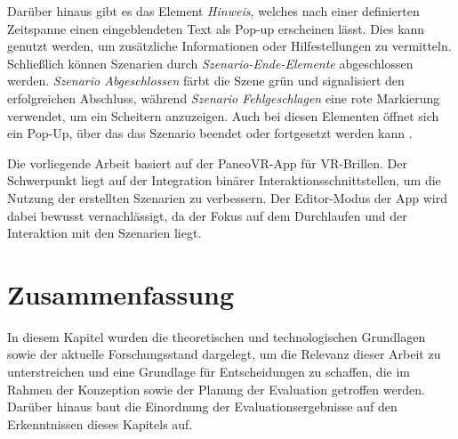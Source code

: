 Darüber hinaus gibt es das Element \textit{Hinweis}, welches nach einer definierten Zeitspanne einen eingeblendeten Text als Pop-up erscheinen lässt. Dies kann genutzt werden, um zusätzliche Informationen oder Hilfestellungen zu vermitteln. Schließlich können Szenarien durch \textit{Szenario-Ende-Elemente} abgeschlossen werden. \textit{Szenario Abgeschlossen} färbt die Szene grün und signalisiert den erfolgreichen Abschluss, während \textit{Szenario Fehlgeschlagen} eine rote Markierung verwendet, um ein Scheitern anzuzeigen. Auch bei diesen Elementen öffnet sich ein Pop-Up, über das das Szenario beendet oder fortgesetzt werden kann \citep{paneovr-handbuch}.

Die vorliegende Arbeit basiert auf der PaneoVR-App für VR-Brillen. Der Schwerpunkt liegt auf der Integration binärer Interaktionsschnittstellen, um die Nutzung der erstellten Szenarien zu verbessern. Der Editor-Modus der App wird dabei bewusst vernachlässigt, da der Fokus auf dem Durchlaufen und der Interaktion mit den Szenarien liegt.

\section{Zusammenfassung} 

In diesem Kapitel wurden die theoretischen und technologischen Grundlagen sowie der aktuelle Forschungsstand dargelegt, um die Relevanz dieser Arbeit zu unterstreichen und eine Grundlage für Entscheidungen zu schaffen, die im Rahmen der Konzeption sowie der Planung der Evaluation getroffen werden. Darüber hinaus baut die Einordnung der Evaluationsergebnisse auf den Erkenntnissen dieses Kapitels auf.

